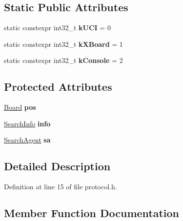 \subsection*{Static Public Attributes}
\begin{DoxyCompactItemize}
\item 
\mbox{\label{classProtocolManager_abda5da0d5f313a17757f56953cc9fb9c}} 
static constexpr int32\+\_\+t {\bfseries k\+U\+CI} = 0
\item 
\mbox{\label{classProtocolManager_aae0d7c85f7908af043982e22b230164c}} 
static constexpr int32\+\_\+t {\bfseries k\+X\+Board} = 1
\item 
\mbox{\label{classProtocolManager_a5efa22d57690c47bc1e7aeaabe898ac8}} 
static constexpr int32\+\_\+t {\bfseries k\+Console} = 2
\end{DoxyCompactItemize}
\subsection*{Protected Attributes}
\begin{DoxyCompactItemize}
\item 
\mbox{\label{classProtocolManager_ad8d2e4041601fb0fb0c51456641f2283}} 
\mbox{\hyperlink{classBoard}{Board}} {\bfseries pos}
\item 
\mbox{\label{classProtocolManager_a1384f769e3bbb83e7876d0d8c21ce4fb}} 
\mbox{\hyperlink{structSearchInfo}{Search\+Info}} {\bfseries info}
\item 
\mbox{\label{classProtocolManager_af985b55fd4fb30eceae7f434c9c3ee05}} 
\mbox{\hyperlink{classSearchAgent}{Search\+Agent}} {\bfseries sa}
\end{DoxyCompactItemize}


\subsection{Detailed Description}


Definition at line 15 of file protocol.\+h.



\subsection{Member Function Documentation}
\mbox{\label{classProtocolManager_a2ab274fd7510b28e7ac36405aebdbe82}} 
